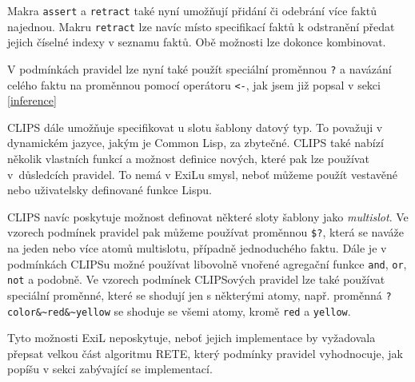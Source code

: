Makra \verb|assert| a \verb|retract| také nyní umožňují přidání či odebrání
více faktů najednou. Makru \verb|retract| lze navíc místo specifikací faktů k
odstranění předat jejich číselné indexy v seznamu faktů. Obě možnosti lze
dokonce kombinovat.

V podmínkách pravidel lze nyní také použít speciální proměnnou \verb|?| a
navázání celého faktu na proměnnou pomocí operátoru \verb|<-|, jak jsem již
popsal v sekci \ref{inference}

CLIPS dále umožňuje specifikovat u slotu šablony datový typ. To považuji v
dynamickém jazyce, jakým je Common Lisp, za zbytečné. CLIPS také nabízí několik
vlastních funkcí a možnost definice nových, které pak lze používat v~důsledcích
pravidel. To nemá v ExiLu smysl, neboť můžeme použít vestavěné nebo uživatelsky
definované funkce Lispu.

CLIPS navíc poskytuje možnost definovat některé sloty šablony jako
\emph{multislot}. Ve vzorech podmínek pravidel pak můžeme používat proměnnou
\verb|$?|, která se naváže na jeden nebo více atomů multislotu, případně
jednoduchého faktu. Dále je v podmínkách CLIPSu možné používat libovolně vnořené
agregační funkce \verb|and|, \verb|or|, \verb|not| a podobně. Ve vzorech
podmínek CLIPSových pravidel lze také používat speciální proměnné, které se
shodují jen s některými atomy, např. proměnná \verb|?color&~red&~yellow| se
shoduje se všemi atomy, kromě \verb|red| a \verb|yellow|.

Tyto možnosti ExiL neposkytuje, neboť jejich implementace by vyžadovala přepsat
velkou část algoritmu RETE, který podmínky pravidel vyhodnocuje, jak popíšu v
sekci zabývající se implementací.
